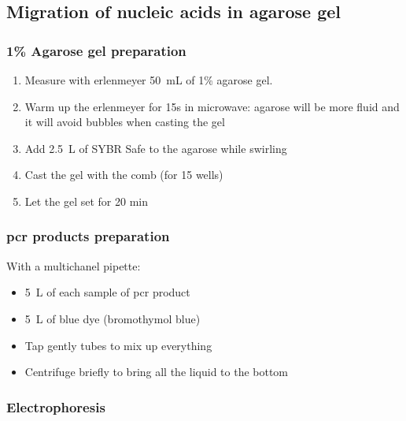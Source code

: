 \subsection{Migration of nucleic acids in agarose gel}
\label{task:20180322_cj1}

\subsubsection{1\% Agarose gel preparation}

\begin{enumerate}
\item Measure with erlenmeyer 50~mL of 1\% agarose gel.
\item Warm up the erlenmeyer for 15s in microwave: agarose will be more fluid and it will avoid bubbles when casting the gel
\item Add 2.5~\textmu L of SYBR Safe to the agarose while swirling 
\item Cast the gel with the comb (for 15 wells)
\item Let the gel set for 20 min
\end{enumerate}

\subsubsection{\gls{pcr} products preparation}

With a multichanel pipette:
\begin{itemize}
\item 5~\textmu L of each sample of \gls{pcr} product
\item 5~\textmu L of blue dye (bromothymol blue)
\item Tap gently tubes to mix up everything
\item Centrifuge briefly to bring all the liquid to the bottom
\end{itemize}

\subsubsection{Electrophoresis}

